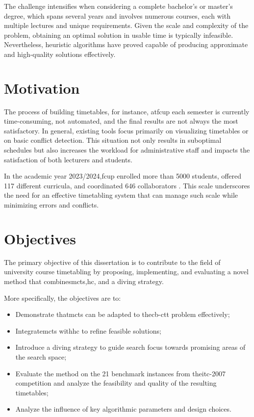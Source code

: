 The challenge intensifies when considering a complete bachelor’s or master’s degree, which spans several years and involves numerous courses, each with multiple lectures and unique requirements. Given the scale and complexity of the problem, obtaining an optimal solution in usable time is typically infeasible. Nevertheless, heuristic algorithms have proved capable of producing approximate and high-quality solutions effectively. 

\section{Motivation}

The process of building timetables, for instance, at\ac{fcup} each semester is currently time-consuming, not automated, and the final results are not always the most satisfactory. In general, existing tools focus primarily on visualizing timetables or on basic conflict detection. This situation not only results in suboptimal schedules but also increases the workload for administrative staff and impacts the satisfaction of both lecturers and students. 

In the academic year 2023/2024,\ac{fcup} enrolled more than 5000 students, offered 117 different curricula, and coordinated 646 collaborators \cite{fcup_em_numeros}. This scale underscores the need for an effective timetabling system that can manage such scale while minimizing errors and conflicts. %

\section{Objectives}

The primary objective of this dissertation is to contribute to the field of university course timetabling by proposing, implementing, and evaluating a novel method that combines\ac{mcts},\ac{hc}, and a diving strategy.

More specifically, the objectives are to:
\begin{itemize}
\item Demonstrate that\ac{mcts} can be adapted to the\ac{cb-ctt} problem effectively;

\item Integrate\ac{mcts} with\ac{hc} to refine feasible solutions;

\item Introduce a diving strategy to guide search focus towards promising areas of the search space;

\item Evaluate the method on the 21 benchmark instances from the\ac{itc-2007} competition and analyze the feasibility and quality of the resulting timetables;

\item Analyze the influence of key algorithmic parameters and design choices.
\end{itemize}

